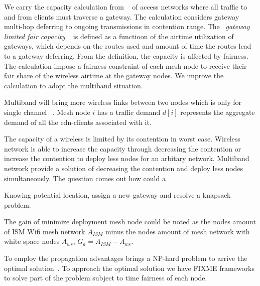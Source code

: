 We carry the capacity calculation from ~\cite{robinson2008adding} of access networks where all traffic to and from clients must traverse a gateway. The calculation considers gateway multi-hop deferring to ongoing transmissions in contention range. 
The ~\emph{gateway limited fair capacity} ~\cite{robinson2008adding} is defined as a functioon of the airtime utilization of gateways, which depends on the routes used and amount of time the routes lead to a gateway deferring. From the definition, the capacity is affected by fairness. The calculation impose a fairness constraint of each mesh node to receive their fair share of the wireless airtime at the gateway nodes. 
We improve the calculation to adopt the multiband situation.

Multiband will bring more wireless links between two nodes which is only for single channel ~\cite{robinson2008adding}. Mesh node $i$ has a traffic demand $d[i]$ represents the aggregate demand of all the edn-clients associated with it. 


The capacity of a wireless is limited by its contention in worst case. 
Wireless network is able to increase the capacity through decreasing the contention or increase the contention to deploy less nodes for an arbitary network.
Multiband network provide a solution of decreasing the contention and deploy less nodes simultaneously. 
The question comes out how could a 

Knowing potential location, assign a new gateway and resolve a knapsack problem.



The gain of minimize deployment mesh node could be noted as the nodes amount of ISM Wifi mesh network $A_{ISM}$ minus the nodes amount of mesh network with white space nodes $A_{ws}$, $G_a=A_{ISM}-A_{ws}$.


To employ the propagation advantages brings a NP-hard problem to arrive the optimal solution~\cite{arkoulis2013optimal}. 
To approach the optimal solution we have FIXME frameworks to solve part of the problem subject to time fairness of each node.




